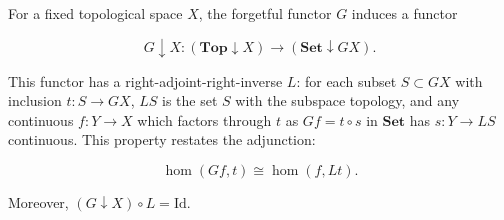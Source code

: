 For a fixed topological space $X$, the forgetful functor $G$ induces a functor

$$G \downarrow X: (\mathbf{Top} \downarrow X) \to (\mathbf{Set} \downarrow GX).$$

This functor has a right-adjoint-right-inverse $L$: for each subset $S \subset GX$ with inclusion $t: S \to GX$, $LS$ is the set $S$ with the subspace topology, and any continuous $f: Y \to X$ which factors through $t$ as $Gf = t \circ s$ in $\mathbf{Set}$ has $s: Y \to LS$ continuous. This property restates the adjunction:

$$\hom(Gf, t) \cong \hom(f, Lt).$$

Moreover, $(G \downarrow X) \circ L = \mathrm{Id}$.
